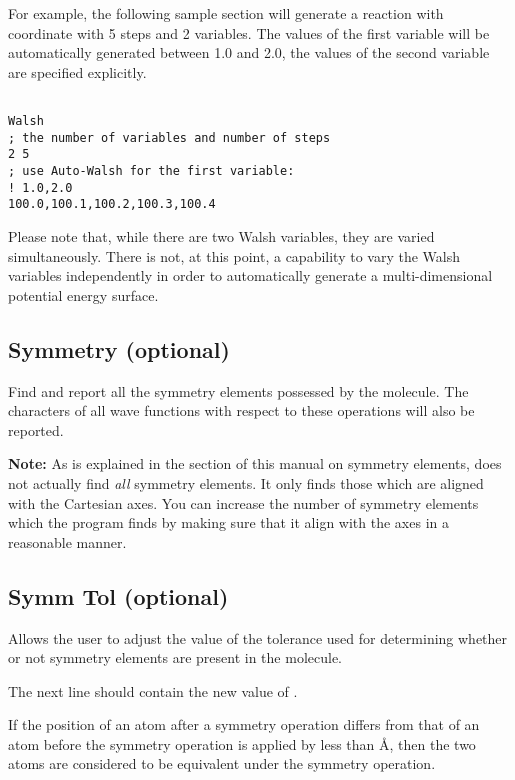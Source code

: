 For example, the following sample section will generate a
reaction with coordinate with 5 steps and 2 variables.  The values of
the first variable will be automatically generated between 1.0 and
2.0, the values of the second variable are specified explicitly.

\shrinkspacing
\begin{verbatim}

Walsh
; the number of variables and number of steps
2 5
; use Auto-Walsh for the first variable:
! 1.0,2.0
100.0,100.1,100.2,100.3,100.4

\end{verbatim}
\resumespacing

Please note that, while there are two Walsh variables, they are varied
simultaneously.  There is not, at this point, a capability to vary the
Walsh variables independently in order to automatically generate a
multi-dimensional potential energy surface.

\subsection{{\sf Symmetry} (optional)}

Find and report all the symmetry elements possessed by the molecule.
The 
characters of all wave functions with respect to these operations will
also be reported. 

{\bf Note:} As is explained in the section of this manual on symmetry
elements, {\calcprog} does not actually find {\em all} symmetry
elements.  It only finds those which are aligned with the Cartesian
axes. You can increase the number of symmetry elements which the
program finds by making sure that it align with the axes in a
reasonable manner.

\subsection{{\sf Symm Tol} (optional)}

Allows the user to adjust the value of the tolerance used
for determining whether or not symmetry elements are present
in the molecule.  

The next line should contain the new value of .

If the position of an atom after a symmetry operation differs from
that of an atom before the symmetry operation is applied by less than 
 \AA, then the two atoms are considered to be equivalent
under the symmetry operation.

